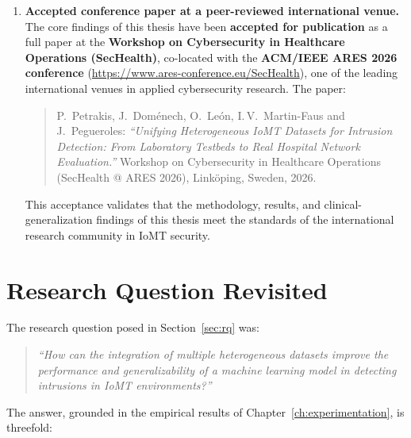 \begin{enumerate}[nosep]
  \item \textbf{Accepted conference paper at a peer-reviewed international venue.}
  The core findings of this thesis have been \textbf{accepted for publication} as a full paper at the \textbf{Workshop on Cybersecurity in Healthcare Operations (SecHealth)}, co-located with the \textbf{ACM/IEEE ARES 2026 conference} (\url{https://www.ares-conference.eu/SecHealth}), one of the leading international venues in applied cybersecurity research. The paper:

  \begin{quote}
  P.~Petrakis, J.~Doménech, O.~León, I.\,V.~Martin-Faus and J.~Pegueroles: \textit{``Unifying Heterogeneous IoMT Datasets for Intrusion Detection: From Laboratory Testbeds to Real Hospital Network Evaluation.''} Workshop on Cybersecurity in Healthcare Operations (SecHealth @ ARES 2026), Linköping, Sweden, 2026.
  \end{quote}

  This acceptance validates that the methodology, results, and clinical-generalization findings of this thesis meet the standards of the international research community in IoMT security.
\end{enumerate}

\section{Research Question Revisited}
\label{sec:rq-revisited}

The research question posed in Section~\ref{sec:rq} was:

\begin{quote}
\textit{``How can the integration of multiple heterogeneous datasets improve the performance and generalizability of a machine learning model in detecting intrusions in IoMT environments?''}
\end{quote}

The answer, grounded in the empirical results of Chapter~\ref{ch:experimentation}, is threefold:

